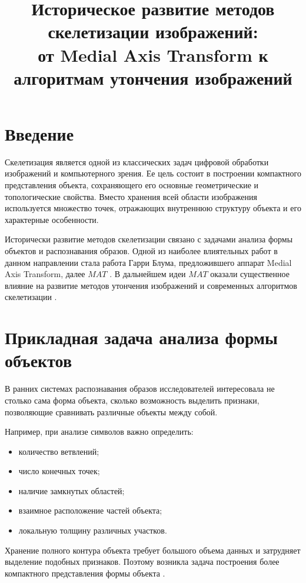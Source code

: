 \documentclass[12pt,a4paper]{article}
\title{
Историческое развитие методов скелетизации изображений:\\
от Medial Axis Transform к алгоритмам утончения изображений
}
\author{}
\date{}
\begin{document}
\maketitle

\section{Введение}

Скелетизация является одной из классических задач цифровой обработки изображений и компьютерного зрения. Ее цель состоит в построении компактного представления объекта, сохраняющего его основные геометрические и топологические свойства. Вместо хранения всей области изображения используется множество точек, отражающих внутреннюю структуру объекта и его характерные особенности.

Исторически развитие методов скелетизации связано с задачами анализа формы объектов и распознавания образов. Одной из наиболее влиятельных работ в данном направлении стала работа Гарри Блума, предложившего аппарат Medial Axis Transform, далее $MAT$ \cite{blum1967}. В дальнейшем идеи $MAT$ оказали существенное влияние на развитие методов утончения изображений и современных алгоритмов скелетизации \cite{lam1992}.

\section{Прикладная задача анализа формы объектов}

В ранних системах распознавания образов исследователей интересовала не столько сама форма объекта, сколько возможность выделить признаки, позволяющие сравнивать различные объекты между собой.

Например, при анализе символов важно определить:

\begin{itemize}
	\item количество ветвлений;
	\item число конечных точек;
	\item наличие замкнутых областей;
	\item взаимное расположение частей объекта;
	\item локальную толщину различных участков.
\end{itemize}

Хранение полного контура объекта требует большого объема данных и затрудняет выделение подобных признаков. Поэтому возникла задача построения более компактного представления формы объекта \cite{blum1967}.
\end{document}
